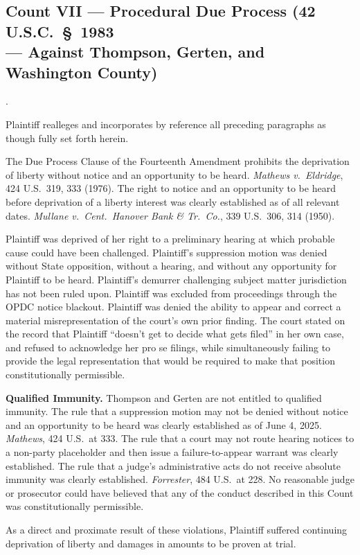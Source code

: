 \documentclass[12pt,letterpaper]{article}
\newcounter{complaintpara}
\newenvironment{paras}{%
	\begin{list}{\arabic{complaintpara}.}{%
			\setlength{\leftmargin}{0.5in}%
			\setlength{\labelwidth}{0.4in}%
			\setlength{\labelsep}{0.1in}%
			\setlength{\itemsep}{0pt}%
			\setlength{\parsep}{0pt}%
			\setlength{\topsep}{6pt}%
		}%
	}{%
	\end{list}%
}
\begin{document}
	\subsection*{Count VII --- Procedural Due Process (42 U.S.C.\ \S\ 1983\\
		--- Against Thompson, Gerten, and Washington County)}
	\begin{paras}
		
		\item Plaintiff realleges and incorporates by reference all
		preceding paragraphs as though fully set forth herein.
		
		\item The Due Process Clause of the Fourteenth Amendment
		prohibits the deprivation of liberty without notice and an
		opportunity to be heard. \textit{Mathews v.\ Eldridge},
		424 U.S.\ 319, 333 (1976). The right to notice and an
		opportunity to be heard before deprivation of a liberty
		interest was clearly established as of all relevant dates.
		\textit{Mullane v.\ Cent.\ Hanover Bank \& Tr.\ Co.},
		339 U.S.\ 306, 314 (1950).
		
		\item Plaintiff was deprived of her right to a preliminary
		hearing at which probable cause could have been challenged.
		Plaintiff's suppression motion was denied without State
		opposition, without a hearing, and without any opportunity
		for Plaintiff to be heard. Plaintiff's demurrer challenging
		subject matter jurisdiction has not been ruled upon.
		Plaintiff was excluded from proceedings through the OPDC
		notice blackout. Plaintiff was denied the ability to appear
		and correct a material misrepresentation of the court's own
		prior finding. The court stated on the record that Plaintiff ``doesn't get to decide what gets filed'' in her own case,
		and refused to acknowledge her pro se filings, while
		simultaneously failing to provide the legal representation
		that would be required to make that position constitutionally
		permissible.
		
		\item \textbf{Qualified Immunity.} Thompson and Gerten are not
		entitled to qualified immunity. The rule that a suppression
		motion may not be denied without notice and an opportunity
		to be heard was clearly established as of June 4, 2025.
		\textit{Mathews}, 424 U.S.\ at 333. The rule that a court
		may not route hearing notices to a non-party placeholder and
		then issue a failure-to-appear warrant was clearly
		established. The rule that a judge's administrative acts
		do not receive absolute immunity was clearly established.
		\textit{Forrester}, 484 U.S.\ at 228. No reasonable judge
		or prosecutor could have believed that any of the conduct
		described in this Count was constitutionally permissible.
		
		\item As a direct and proximate result of these violations,
		Plaintiff suffered continuing deprivation of liberty and
		damages in amounts to be proven at trial.
		
	\end{paras}
\end{document}
